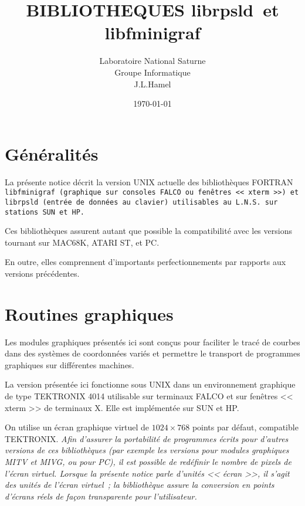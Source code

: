 \documentclass[a4paper,12pt,titlepage]{article}
\title{BIBLIOTHEQUES  \bf librpsld\rm\  et \bf libfminigraf\rm}
\author{Laboratoire  National Saturne\\
        Groupe Informatique\\
        J.L.Hamel}
\date{\today}
\begin{document}
\maketitle

\tableofcontents
\newpage

\section{G\'en\'eralit\'es}

La pr\'esente notice d\'ecrit la version UNIX actuelle des biblioth\`eques
FORTRAN \tt lib\-fmini\-graf\rm\  (graphique sur consoles FALCO ou fen\^etres
<< xterm >>) et
\tt librpsld\rm\  (entr\'ee de donn\'ees au clavier) utilisables au L.N.S. sur
stations SUN et HP.

Ces biblioth\`eques assurent autant que possible la compatibilit\'e avec les
versions tournant sur MAC68K, ATARI ST, et PC.

En outre, elles comprennent d'importants perfectionnements par rapports aux
versions pr\'e\-c\'e\-dentes.

\section{Routines graphiques}

    Les   modules  graphiques  pr\'esent\'es  ici  sont  con\c{c}us   pour 
faciliter  le  trac\'e de courbes dans des syst\`emes  de  coordonn\'ees 
vari\'es et permettre le transport de programmes graphiques sur
diff\'erentes machines. 

   La version pr\'esent\'ee ici fonctionne sous UNIX dans un environnement
graphique de type TEKTRONIX 4014 utilisable sur terminaux FALCO et sur
fen\^etres << xterm >> de terminaux X. Elle est impl\'ement\'ee sur SUN et
HP.

    On utilise un \'ecran graphique virtuel de $1024 \times 768$ points par
d\'efaut, compatible TEKTRONIX. \em Afin d'assurer la portabilit\'e de
programmes \'ecrits pour d'autres versions de ces biblioth\`eques (par
exemple les versions pour modules graphiques MITV et MIVG, ou pour PC), il
est possible de red\'efinir le nombre de pixels de l'\'ecran virtuel. \em
Lorsque la pr\'esente notice parle \em d'unit\'es << \'ecran >>\em, il s'agit des
unit\'es de \em l'\'ecran virtuel\em\ ; la biblioth\`eque assure la conversion en
points d'\'ecrans r\'eels de fa\c{c}on transparente pour l'utilisateur.
\end{document}
